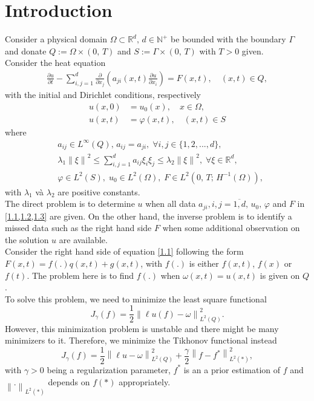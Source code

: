 \documentclass[]{article}
\begin{document}
\justifying

\thispagestyle{empty}

\newpage
\section{Introduction}
Consider a physical domain $\Omega \subset \mathbb{R}^d,\, d\in \mathbb{N^+}$ be bounded with the boundary $\Gamma$ and donate $Q:=\Omega\times (0,\, T)$ and $ S:=\Gamma \times (0,\, T)$ with $T>0$ given. 
\\
Consider the heat equation
\begin{align}\label{1.1}
	\frac{\partial u}{\partial t}-\sum_{i, j=1}^{d}\frac{\partial}{\partial x_j}\left(a_{ji}(x, t)\frac{\partial u}{\partial x_i}\right)=F(x, t), \quad(x, t)\in Q,
\end{align}
with the initial and Dirichlet conditions, respectively
\begin{align}
	u(x, 0)&=u_0(x),\quad x\in \Omega,\label{1.2}\\
	u(x, t)&=\varphi(x, t),\quad(x, t)\in S \label{1.3}
\end{align}
where
\begin{align*}
	&a_{ij}\in L^{\infty}(Q),\, a_{ij}=a_{ji},\; \forall i, j\in \{1, 2, ..., d\},\\
	&\lambda_1\left\|\xi\right\|^2\leq \sum_{i, j=1}^{d}a_{ij}\xi_i\xi_j\leq \lambda_2\left\|\xi\right\|^2,\; \forall \xi\in\mathbb{R}^d,\\
	&\varphi\in L^2(S),\; u_0\in L^2(\Omega),\; F\in L^2(0,\, T;\, H^{-1}(\Omega)),
\end{align*}
with $\lambda_1$ và $\lambda_2$ are positive constants.
\\
The direct problem is to determine $u$ when all data $a_{ji}, i, j=\overline{1, d}, \,u_0, \,\varphi$ and $F$ in \cref{1.1,1.2,1.3} are given. On the other hand, the inverse problem is to identify a missed data such as the right hand side $F$ when some additional observation on the solution $u$ are available. 
\\
Consider the right hand side of equation \eqref{1.1} following the form $F(x, t)=f(.)q(x, t)+g(x, t)$, with $f(.)$ is either $f(x, t)$, $f(x)$ or $f(t)$. The problem here is to find $f(.)$ when $\omega(x, t)=u(x, t)$ is given on $Q$.
\\ To solve this problem, we need to minimize the least square functional 
$$J_{\gamma}(f)=\frac{1}{2}\left\|\ell u(f)-\omega\right\|_{L^2(Q)}^2.$$
However, this minimization problem is unstable and there might be many minimizers to it. Therefore, we minimize the Tikhonov functional instead
$$J_{\gamma}(f)=\frac{1}{2}\left\|\ell u-\omega\right\|_{L^2(Q)}^2+\frac{\gamma}{2}\left\|f-f^*\right\|_{L^2(*)}^2,$$
with $\gamma>0$ being a regularization parameter, $f^*$ is an a prior estimation of $f$ and $\left\|.\right\|_{L^2(*)}$ depends on $f(*)$ appropriately.
\end{document}
